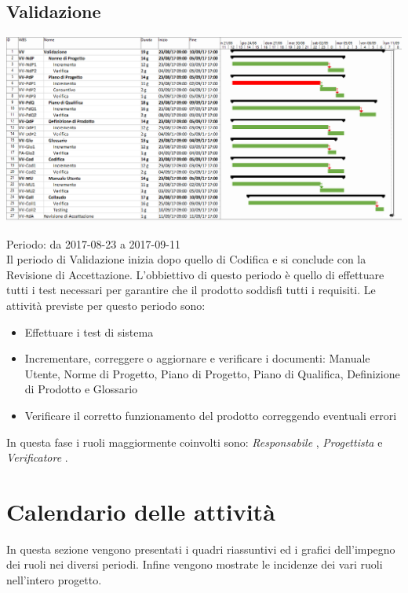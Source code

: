 \subsection{Validazione}

\begin{center}
  \includegraphics[scale=0.18]{img/6-VA.png}
\end{center}

Periodo: da 2017-08-23 a 2017-09-11 \\
Il periodo di Validazione inizia dopo quello di Codifica e si conclude con la Revisione
di Accettazione.
L'obbiettivo di questo periodo è quello di effettuare tutti i test necessari per garantire
che il prodotto soddisfi tutti i requisiti. 
Le attività previste per questo periodo sono:
\begin{itemize}
\item Effettuare i test di sistema
\item Incrementare, correggere o aggiornare e verificare i documenti: Manuale Utente, Norme di Progetto, Piano di Progetto, Piano di Qualifica, Definizione di Prodotto e Glossario
\item Verificare il corretto funzionamento del prodotto correggendo eventuali errori
\end{itemize}

In questa fase i ruoli maggiormente coinvolti sono:  \emph{Responsabile} ,  \emph{Progettista} 
e  \emph{Verificatore} .

\section{Calendario delle attività}
In questa sezione vengono presentati i quadri riassuntivi ed i grafici dell’impegno dei ruoli nei diversi periodi. Infine vengono mostrate le incidenze dei vari ruoli nell’intero progetto.


